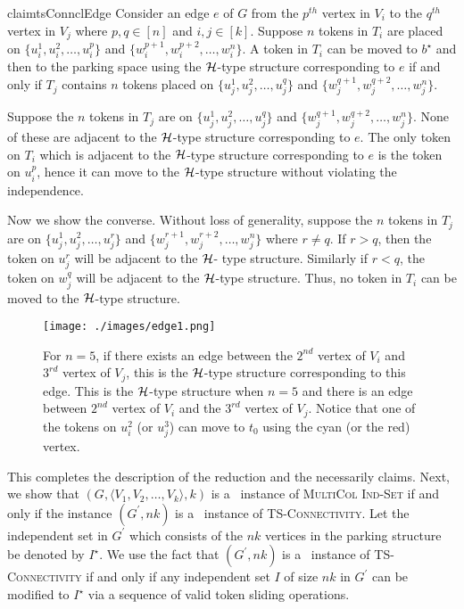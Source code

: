 \begin{restatable}{claim}{tsConnclEdge}
\label{cl:edge}
Consider an edge $e$ of $G$ from the $p^{th}$ vertex in $V_i$ 
to the $q^{th}$ vertex in $V_j$ where $p,q\in [n]$ and $i,j\in [k]$.
Suppose $n$ tokens in $T_i$ are placed on $\{u_i^1,u_i^2,\ldots,u_i^p\}$ 
and $\{w_i^{p+1},w_i^{p+2},\ldots,w_i^n\}$. 
A token in $T_i$ can be moved to $b^{\star}$ and then to the parking 
space using the ${\mathcal H}$-type structure corresponding to $e$ 
if and only if $T_j$ contains $n$ tokens placed on 
$\{u_j^1,u_j^2,\ldots,u_j^q\}$ and 
$\{w_j^{q+1},w_j^{q+2},\ldots,w_j^n\}$.
\end{restatable}
\begin{claimproof}
Suppose the $n$ tokens in $T_j$ are on $\{u_j^1,u_j^2,\ldots,u_j^q\}$ 
and $\{w_j^{q+1},w_j^{q+2},\ldots,w_j^n\}$. 
None of these are adjacent to the ${\mathcal H}$-type structure 
corresponding to $e$. 
The only token on $T_i$ which is adjacent to the 
${\mathcal H}$-type structure corresponding to $e$ is the 
token on $u_i^p$, hence it can move to the 
${\mathcal H}$-type structure without violating the independence.

Now we show the converse. Without loss of generality, 
suppose the $n$ tokens in $T_j$ are on 
$\{u_j^1,u_j^2,\ldots,u_j^r\}$ and $\{w_j^{r+1},w_j^{r+2},\ldots,w_j^n\}$ 
where $r\neq q$. 
If $r>q$, then the token on $u_j^r$ will 
be adjacent to the ${\mathcal H}$- type structure. 
Similarly if $r<q$, the token on $w_j^q$ 
will be adjacent to the ${\mathcal H}$-type structure. 
Thus, no token in $T_i$ can be moved to the ${\mathcal H}$-type structure.
\end{claimproof}

\begin{figure}
    \centering
    \texttt{[image: ./images/edge1.png]}
    \caption{For $n = 5$, if there exists an edge between the $2^{nd}$
    vertex of $V_i$ and $3^{rd}$ vertex of $V_j$, 
    this is the ${\mathcal H}$-type structure corresponding to this edge.
    This is the ${\mathcal H}$-type structure when $n=5$ and 
    there is an edge between $2^{nd}$ vertex of $V_i$ and 
    the $3^{rd}$ vertex of $V_j$. 
    Notice that one of the tokens on $u_i^{2}$ (or $u_j^{3}$) 
    can move to $t_0$ using the cyan (or the red) vertex.}
\label{Encoding_edges_TSC} 
\vspace{-5mm}
\end{figure}

This completes the description of the reduction and the necessarily claims.
Next, we show that $(G,\langle V_1,V_2,\ldots,V_k\rangle, k)$
is a \yes\ instance of \textsc{MultiCol Ind-Set} if and only if
the instance $(G^\prime,nk)$ is a \no\ instance of 
\textsc{TS-Connectivity}. 
Let the independent set in $G^\prime$ which consists of the 
$nk$ vertices in the parking structure be denoted by $I^\star$.
We use the fact that $(G^\prime,nk)$ is a \yes\ instance of 
\textsc{TS-Connectivity} if and only if any 
independent set $I$ of size $nk$ in $G^\prime$ can be 
modified to $I^\star$ via a sequence of valid token sliding operations.

